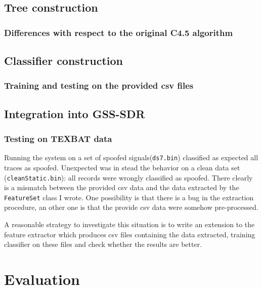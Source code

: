 \documentclass[a4paper]{usiinfbachelorproject}
\begin{document}
\subsection{Tree construction}

\subsubsection{Differences with respect to the original C4.5 algorithm}

\subsection{Classifier construction}

\subsubsection{Training and testing on the provided csv files}

\subsection{Integration into GSS-SDR}

\subsubsection{Testing on TEXBAT data}

Running the system on a set of spoofed signals(\texttt{ds7.bin}) classified as expected all traces
as spoofed. Unexpected was in stead the behavior on a clean data set (\texttt{cleanStatic.bin}):
all records were wrongly classified as spoofed. There clearly is a mismatch between the provided csv data 
and the data extracted by the \texttt{FeatureSet} class I wrote. One possibility is that there is a bug in the extraction
procedure, an other one is that the provide csv data were somehow pre-processed.

A reasonable strategy to investigate this situation is to write an extension to the feature extractor which
produces csv files containing the data extracted, training classifier on these files and check whether the results are better.







\section{\textbf{Evaluation}}
\end{document}

